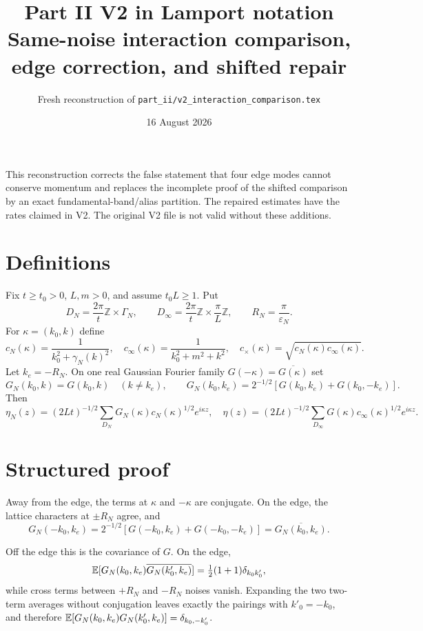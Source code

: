\documentclass[11pt,a4paper]{article}
\title{Part II V2 in Lamport notation\\[3pt]
\large Same-noise interaction comparison, edge correction, and shifted repair}
\author{Fresh reconstruction of \texttt{part\_ii/v2\_interaction\_comparison.tex}}
\date{16 August 2026}
\newcommand{\eps}{\varepsilon}
\begin{document}
\maketitle

\begin{resultbox}
This reconstruction corrects the false statement that four edge modes cannot conserve
momentum and replaces the incomplete proof of the shifted comparison by an exact
fundamental-band/alias partition.  The repaired estimates have the rates claimed in V2.
The original V2 file is not valid without these additions.
\end{resultbox}
\tableofcontents

\section{Definitions}

Fix $t\ge t_0>0$, $L,m>0$, and assume $t_0L\ge1$.  Put
\[
 D_N=\frac{2\pi}{t}\mathbb Z\times\Gamma_N,\qquad
 D_\infty=\frac{2\pi}{t}\mathbb Z\times\frac\pi L\mathbb Z,\qquad
 R_N=\frac\pi{\eps_N}.
\]
For $\kappa=(k_0,k)$ define
\[
 c_N(\kappa)=\frac1{k_0^2+\gamma_N(k)^2},\quad
 c_\infty(\kappa)=\frac1{k_0^2+m^2+k^2},\quad
 c_\times(\kappa)=\sqrt{c_N(\kappa)c_\infty(\kappa)}.
\tag{0.1}
\]
Let $k_e=-R_N$.  On one real Gaussian Fourier family $G(-\kappa)=\overline{G(\kappa)}$
set
\[
 G_N(k_0,k)=G(k_0,k)\quad(k\ne k_e),\qquad
 G_N(k_0,k_e)=2^{-1/2}[G(k_0,k_e)+G(k_0,-k_e)].\tag{0.2}
\]
Then
\[
 \eta_N(z)=(2Lt)^{-1/2}\sum_{D_N}G_N(\kappa)c_N(\kappa)^{1/2}e^{i\kappa z},
\quad
 \eta(z)=(2Lt)^{-1/2}\sum_{D_\infty}G(\kappa)c_\infty(\kappa)^{1/2}e^{i\kappa z}.
\tag{0.3}
\]

\section{Structured proof}



\Because Away from the edge, the terms at $\kappa$ and $-\kappa$ are conjugate.  On
the edge, the lattice characters at $\pm R_N$ agree, and
\[
 G_N(-k_0,k_e)=2^{-1/2}[G(-k_0,k_e)+G(-k_0,-k_e)]
 =\overline{G_N(k_0,k_e)}.
\]


\Because Off the edge this is the covariance of $G$.  On the edge,
\[
 \mathbb E[G_N(k_0,k_e)\overline{G_N(k'_0,k_e)}]
 =\tfrac12(1+1)\delta_{k_0k'_0},
\]
while cross terms between $+R_N$ and $-R_N$ noises vanish.  Expanding the two
two-term averages without conjugation leaves exactly the pairings with
$k'_0=-k_0$, and therefore
$\mathbb E[G_N(k_0,k_e)G_N(k'_0,k_e)]=\delta_{k_0,-k'_0}$.
\end{document}
